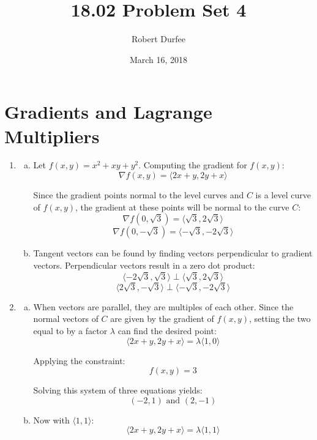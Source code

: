 \documentclass{article}
\title{ 18.02 Problem Set 4 }
\author{ Robert Durfee }
\date{ March 16, 2018 }
\begin{document}
\maketitle

\section{ Gradients and Lagrange Multipliers }

\begin{enumerate}[1.]
  \item \begin{enumerate}[a.]
    \item Let $f(x,y) = x^{2} + xy + y^{2}$. Computing the gradient for $f(x,
      y)$:
      $$ \nabla f(x, y) = \langle 2x + y, 2y + x \rangle $$

      Since the gradient points normal to the level curves and $C$ is a level
      curve of $f(x, y)$, the gradient at these points will be normal to the
      curve $C$:
      $$ \nabla f(0, \sqrt{3}) = \langle \sqrt{3}, 2 \sqrt{3} \rangle $$
      $$ \nabla f(0, -\sqrt{3}) = \langle -\sqrt{3}, -2 \sqrt{3} \rangle $$

    \item Tangent vectors can be found by finding vectors perpendicular to
      gradient vectors. Perpendicular vectors result in a zero dot product:
      $$ \langle -2\sqrt{3}, \sqrt{3} \rangle \perp \langle \sqrt{3}, 2\sqrt{3}
      \rangle $$
      $$ \langle 2 \sqrt{3}, -\sqrt{3} \rangle \perp \langle -\sqrt{3}, -2
      \sqrt{3} \rangle $$
    \end{enumerate}
  \item \begin{enumerate}[a.]
      \item When vectors are parallel, they are multiples of each other. Since
        the normal vectors of $C$ are given by the gradient of $f(x, y)$,
        setting the two equal to by a factor $\lambda$ can find the desired
        point:
        $$ \langle 2x + y, 2y + x \rangle = \lambda \langle 1, 0 \rangle $$

        Applying the constraint:
        $$ f(x, y) = 3 $$

        Solving this system of three equations yields:
        $$ (-2, 1) \textrm{ and } (2, -1) $$

      \item Now with $\langle 1, 1 \rangle$:
        $$ \langle 2x + y, 2y + x \rangle = \lambda \langle 1, 1 \rangle $$


\end{enumerate}
\end{enumerate}
\end{document}
